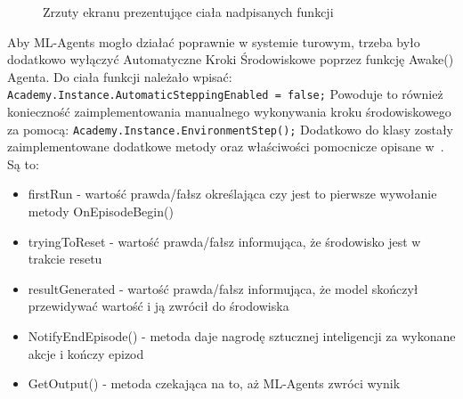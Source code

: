 \documentclass{SGGW-thesis}
\begin{document}
\begin{figure}[H]
  \ContinuedFloat
  \centering
  \hfill
  \addtocounter{figure}{1}
  \caption{Zrzuty ekranu prezentujące ciała nadpisanych funkcji}
\end{figure}
Aby ML-Agents mogło działać poprawnie w systemie turowym, trzeba było dodatkowo wyłączyć Automatyczne Kroki Środowiskowe poprzez funkcję Awake() Agenta. Do ciała funkcji należało wpisać: \verb|Academy.Instance.AutomaticSteppingEnabled = false;|
Powoduje to również konieczność zaimplementowania manualnego wykonywania kroku środowiskowego za pomocą: \verb|Academy.Instance.EnvironmentStep();|
Dodatkowo do klasy zostały zaimplementowane dodatkowe metody oraz właściwości pomocnicze opisane w~\cite{MLAgentsStartegyGuide}. Są to:
\begin{itemize}
  \item{firstRun - wartość prawda/fałsz określająca czy jest to pierwsze wywołanie metody OnEpisodeBegin()}
  \item{tryingToReset - wartość prawda/fałsz informująca, że środowisko jest w trakcie resetu}
  \item{resultGenerated - wartość prawda/fałsz informująca, że model skończył przewidywać wartość i ją zwrócił do środowiska}
  \item{NotifyEndEpisode() - metoda daje nagrodę sztucznej inteligencji za wykonane akcje i kończy epizod}
  \item{GetOutput() - metoda czekająca na to, aż ML-Agents zwróci wynik}
\end{itemize}
\end{document}
